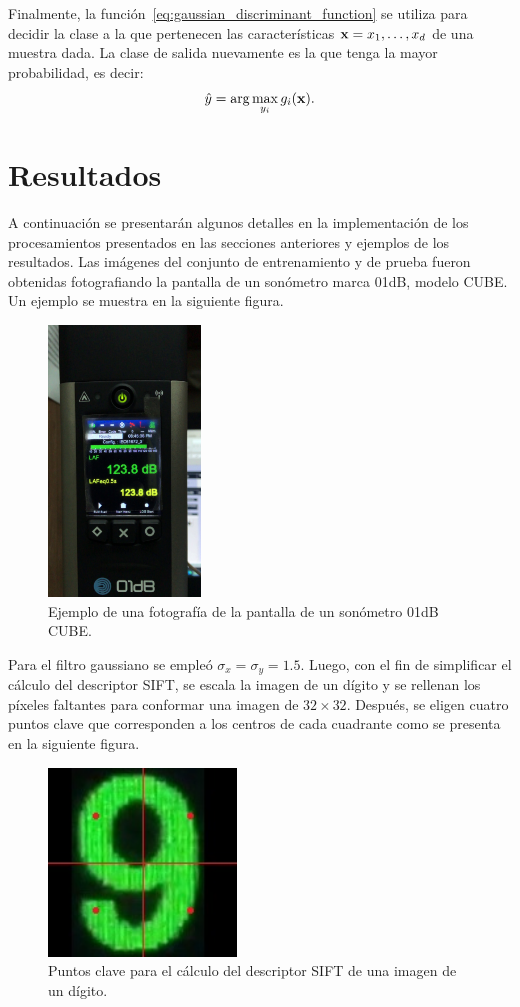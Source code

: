 Finalmente, la función~\eqref{eq:gaussian_discriminant_function} se utiliza para decidir la clase a la que pertenecen las características $\mathrm{\mathbf{x}} = x_1, \dots, x_d$ de una muestra dada.
La clase de salida nuevamente es la que tenga la mayor probabilidad, es decir:
%
\begin{equation}
    \hat{y} = \arg\max_{y_i} g_i(\mathrm{\mathbf{x}}).
\end{equation}
\vfill

\section*{Resultados}

A continuación se presentarán algunos detalles en la implementación de los procesamientos presentados en las secciones anteriores y ejemplos de los resultados.
Las imágenes del conjunto de entrenamiento y de prueba fueron obtenidas fotografiando la pantalla de un sonómetro marca 01dB, modelo CUBE. Un ejemplo se muestra en la siguiente figura.
%
\begin{figure}[h]
    \caption{Ejemplo de una fotografía de la pantalla de un sonómetro 01dB CUBE.}
    \label{fig:slm_screen}
    \centering
    \includegraphics[height=7.2cm]{3_reconocimiento/Figs/slm_screen}
\end{figure}

Para el filtro gaussiano se empleó $\sigma_x = \sigma_y = \num{1.5}$.
Luego, con el fin de simplificar el cálculo del descriptor SIFT, se escala la imagen de un dígito y se rellenan los píxeles faltantes para conformar una imagen de $32 \times 32$.
Después, se eligen cuatro puntos clave que corresponden a los centros de cada cuadrante como se presenta en la siguiente figura.
%
\begin{figure}[h]
    \caption{Puntos clave para el cálculo del descriptor SIFT de una imagen de un dígito.}
    \label{fig:keypoints_SIFT}
    \centering
    \includegraphics[height=5cm]{3_Reconocimiento/Figs/keypoints_SIFT}
\end{figure}

